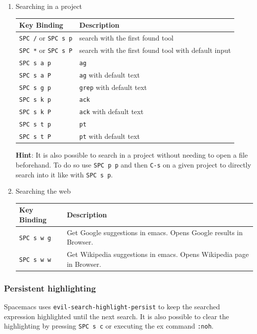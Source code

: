 \documentclass[11pt]{article}
\begin{document}
\begin{enumerate}
\item Searching in a project
\label{sec:org7eedc5e}
\begin{center}
\begin{tabular}{ll}
Key Binding & Description\\
\hline
\texttt{SPC /}  or \texttt{SPC s p} & search with the first found tool\\
\texttt{SPC *}  or \texttt{SPC s P} & search with the first found tool with default input\\
\texttt{SPC s a p} & \texttt{ag}\\
\texttt{SPC s a P} & \texttt{ag} with default text\\
\texttt{SPC s g p} & \texttt{grep} with default text\\
\texttt{SPC s k p} & \texttt{ack}\\
\texttt{SPC s k P} & \texttt{ack} with default text\\
\texttt{SPC s t p} & \texttt{pt}\\
\texttt{SPC s t P} & \texttt{pt} with default text\\
\end{tabular}
\end{center}

\textbf{Hint}: It is also possible to search in a project without needing to open a
file beforehand. To do so use \texttt{SPC p p} and then \texttt{C-s} on a given project to
directly search into it like with \texttt{SPC s p}.

\item Searching the web
\label{sec:org01970ac}

\begin{center}
\begin{tabular}{ll}
Key Binding & Description\\
\hline
\texttt{SPC s w g} & Get Google suggestions in emacs. Opens Google results in Browser.\\
\texttt{SPC s w w} & Get Wikipedia suggestions in emacs. Opens Wikipedia page in Browser.\\
\end{tabular}
\end{center}
\end{enumerate}

\subsubsection{Persistent highlighting}
\label{sec:org1a484ab}
Spacemacs uses \texttt{evil-search-highlight-persist} to keep the searched expression
highlighted until the next search. It is also possible to clear the highlighting
by pressing \texttt{SPC s c} or executing the ex command \texttt{:noh}.
\end{document}
